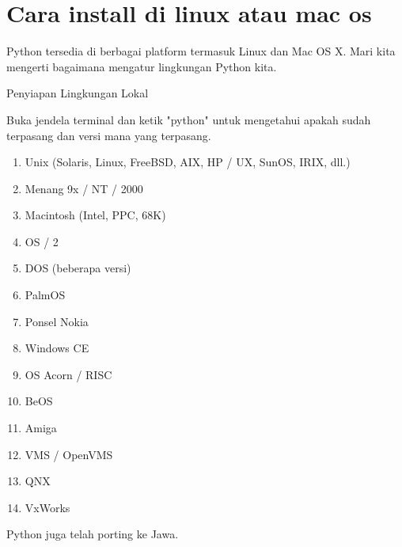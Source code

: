 \noindent
{\fontsize{14pt}{14pt}\section {Cara install di linux atau mac os}
	
	
\vspace{14pt}
\noindent
{\fontsize{14pt}{14pt}\selectfont Python tersedia di berbagai platform termasuk Linux dan Mac OS X. Mari kita mengerti bagaimana mengatur lingkungan Python kita. \\} \par
\vspace{14pt}
\noindent
{\fontsize{14pt}{14pt}\selectfont Penyiapan Lingkungan Lokal \\} \par
\noindent
{\fontsize{14pt}{14pt}\selectfont Buka jendela terminal dan ketik "python" untuk mengetahui apakah sudah terpasang dan versi mana yang terpasang. \\} \par

\begin{enumerate}
	\item Unix (Solaris, Linux, FreeBSD, AIX, HP / UX, SunOS, IRIX, dll.)
\item	Menang 9x / NT / 2000
\item	Macintosh (Intel, PPC, 68K)
\item	OS / 2
\item	DOS (beberapa versi)
\item	PalmOS
\item	Ponsel Nokia
\item	Windows CE
\item	OS Acorn / RISC
\item	BeOS
\item	Amiga
\item	VMS / OpenVMS
\item	QNX
\item	VxWorks
	
\end{enumerate}

\noindent
{\fontsize{14pt}{14pt}\selectfont Python juga telah porting ke Jawa. \\} \par

}
